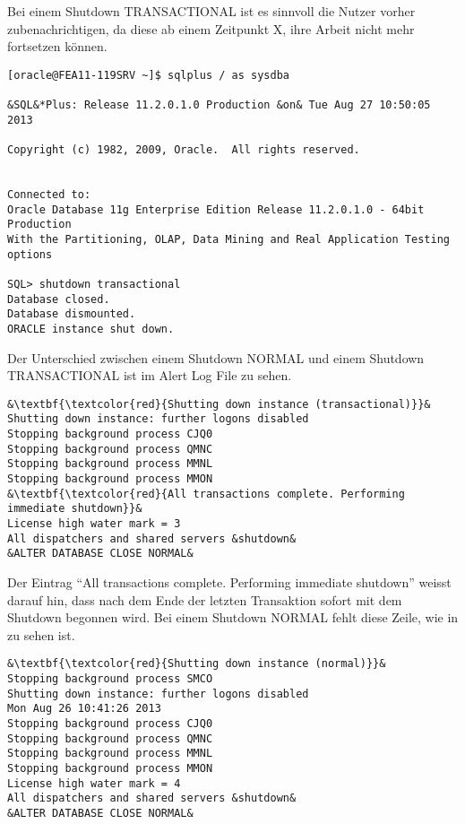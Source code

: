         \begin{merke}
          Bei einem Shutdown TRANSACTIONAL ist es sinnvoll die Nutzer vorher zubenachrichtigen, da diese ab einem Zeitpunkt X, ihre Arbeit nicht mehr fortsetzen können.
        \end{merke}
        \begin{lstlisting}[caption={Durchführen eines Shutdown
        TRANSACTIONAL},label=admin09,language=sqlplus]
[oracle@FEA11-119SRV ~]$ sqlplus / as sysdba

&SQL&*Plus: Release 11.2.0.1.0 Production &on& Tue Aug 27 10:50:05 2013

Copyright (c) 1982, 2009, Oracle.  All rights reserved.


Connected to:
Oracle Database 11g Enterprise Edition Release 11.2.0.1.0 - 64bit Production
With the Partitioning, OLAP, Data Mining and Real Application Testing options

SQL> shutdown transactional
Database closed.
Database dismounted.
ORACLE instance shut down.
        \end{lstlisting}
        Der Unterschied zwischen einem Shutdown NORMAL und einem Shutdown TRANSACTIONAL ist im Alert Log File zu sehen.
        \begin{lstlisting}[caption={Der Shutdown TRANSACTIONAL im Alert
        Log},label=admin10,language=terminal]
&\textbf{\textcolor{red}{Shutting down instance (transactional)}}&
Shutting down instance: further logons disabled
Stopping background process CJQ0
Stopping background process QMNC
Stopping background process MMNL
Stopping background process MMON
&\textbf{\textcolor{red}{All transactions complete. Performing immediate shutdown}}&
License high water mark = 3
All dispatchers and shared servers &shutdown&
&ALTER DATABASE CLOSE NORMAL&
        \end{lstlisting}
        Der Eintrag \enquote{All transactions complete. Performing immediate shutdown} weisst darauf hin, dass nach dem Ende der letzten Transaktion sofort mit dem Shutdown begonnen wird. Bei einem Shutdown NORMAL fehlt diese Zeile, wie in  zu sehen ist.
        \begin{lstlisting}[caption={Der Shutdown NORMAL im Alert Log},label=admin11,language=terminal]
&\textbf{\textcolor{red}{Shutting down instance (normal)}}&
Stopping background process SMCO
Shutting down instance: further logons disabled
Mon Aug 26 10:41:26 2013
Stopping background process CJQ0
Stopping background process QMNC
Stopping background process MMNL
Stopping background process MMON
License high water mark = 4
All dispatchers and shared servers &shutdown&
&ALTER DATABASE CLOSE NORMAL&
       \end{lstlisting}

